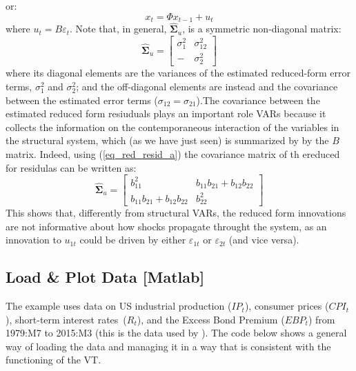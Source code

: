 \documentclass[10pt]{article}
\begin{document}
or:%
\begin{equation}
x_{t}=\Phi x_{t-1}+u_{t}  \label{eq:red_var_3}
\end{equation}%
where $u_{t}=B\varepsilon _{t}$. Note that, in general, $\mathbf{\hat{\Sigma}%
}_{u}$, is a symmetric non-diagonal matrix:%
\begin{equation}
\mathbf{\hat{\Sigma}}_{u}=\left[ 
\begin{array}{cc}
\sigma _{1}^{2} & \sigma _{12}^{2} \\ 
- & \sigma _{2}^{2}%
\end{array}%
\right]  \label{eq:red_cov_1}
\end{equation}%
where its diagonal elements are the variances of the estimated reduced-form
error terms, $\sigma _{1}^{2}$ and $\sigma _{2}^{2}$; and the off-diagonal
elements are instead and the covariance between the estimated error terms ($%
\sigma _{12}=\sigma _{21}$).The covariance between the estimated reduced
form resiuduals plays an important role VARs because it collects the
information on the contemporaneous interaction of the variables in the
structural system, which (as we have just seen) is summarized by by the $B$
matrix. Indeed, using (\ref{eq_red_resid_a}) the covariance matrix of th
ereduced for residulas can be written as:%
\begin{equation}
\mathbf{\hat{\Sigma}}_{u}=\left[ 
\begin{array}{cc}
b_{11}^{2} & b_{11}b_{21}+b_{12}b_{22} \\ 
b_{11}b_{21}+b_{12}b_{22} & b_{22}^{2}%
\end{array}%
\right]  \label{eq:red_cov_2}
\end{equation}%
This shows that, differently from structural VARs, the reduced form
innovations are not informative about how shocks propagate throught the
system, as an innovation to $u_{1t}$ could be driven by either $\varepsilon
_{1t}$ or $\varepsilon _{2t}$ (and vice versa).

\subsection{Load \& Plot Data {\color{note} {\protect\small {[Matlab]}}}}

The example uses data on US industrial production ($IP_{t}$), consumer
prices ($CPI_{t}$), short-term interest rates\ ($R_{t}$), and the Excess
Bond Premium ($EBP_{t}$) from 1979:M7 to 2015:M3 (this is the data used by 
\cite{GertlerKaradi2015}). The code below shows a general way of loading the
data and managing it in a way that is consistent with the functioning of the
VT.
\end{document}
